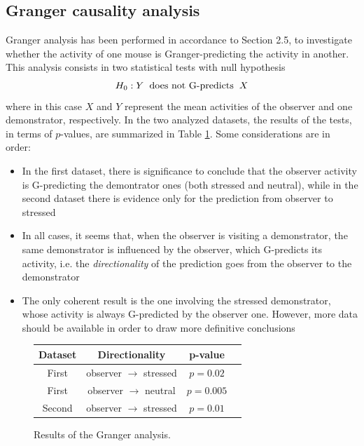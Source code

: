 \documentclass[12pt, a4paper]{article}
\begin{document}
\subsection{Granger causality analysis}

Granger analysis has been performed in accordance to Section 2.5, to investigate whether the activity of one mouse is Granger-predicting the activity in another. This analysis consists in two statistical tests with null hypothesis
$$ H_0:  Y \hspace{0.2cm} \text{does not G-predicts} \hspace{0.2 cm} X $$
where in this case $X$ and $Y$ represent the mean activities of the observer and one demonstrator, respectively. In the two analyzed datasets, the results of the tests, in terms of $p$-values, are summarized in Table \ref{Granger table}. Some considerations are in order:

\begin{itemize}
	\item In the first dataset, there is significance to conclude that the observer activity is G-predicting the demontrator ones (both stressed and neutral), while in the second dataset there is evidence only for the prediction from observer to stressed
	
	\item In all cases, it seems that,  when the observer is visiting a demonstrator, the same demonstrator is influenced by the observer, which G-predicts its activity, i.e. the \textit{directionality} of the prediction goes from the observer to the demonstrator
	
	\item The only coherent result is the one involving the stressed demonstrator, whose activity is always G-predicted by the observer one. However, more data should be available in order to draw more definitive conclusions
\end{itemize}



\begin{figure}[H]
	\begin{center}
		\begin{tabular}{ |c|c|c|c| } 
			\hline
			\textbf{Dataset} & \textbf{Directionality} & \textbf{p-value} \\
			\hline
			First & observer $\rightarrow$ stressed & $p = 0.02$ \\ 
			\hline
			First & observer $\rightarrow$ neutral & $p = 0.005$ \\
			\hline
			Second & observer $\rightarrow$ stressed & $p  =  0.01$ \\
			
			\hline
		\end{tabular}
		
	\end{center}
	\caption{Results of the Granger analysis.} \label{Granger table}
\end{figure}
\end{document}

